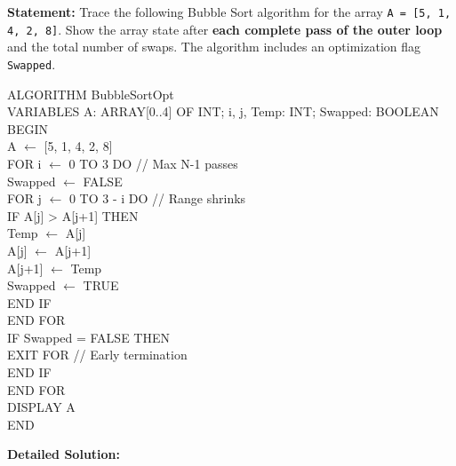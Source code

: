 \documentclass[11pt]{article}
\begin{document}
\begin{exoresolu}
\textbf{Statement:} Trace the following Bubble Sort algorithm for the array \texttt{A = [5, 1, 4, 2, 8]}. Show the array state after \textbf{each complete pass of the outer loop} and the total number of swaps. The algorithm includes an optimization flag \texttt{Swapped}.
\begin{flushleft}
\ttfamily\small
ALGORITHM BubbleSortOpt\\
VARIABLES A: ARRAY[0..4] OF INT; i, j, Temp: INT; Swapped: BOOLEAN\\
BEGIN\\
\hspace{1em}A $\leftarrow$ [5, 1, 4, 2, 8]\\
\hspace{1em}FOR i $\leftarrow$ 0 TO 3 DO \hspace{2em}// Max N-1 passes\\
\hspace{2em}Swapped $\leftarrow$ FALSE\\
\hspace{2em}FOR j $\leftarrow$ 0 TO 3 - i DO \hspace{1em}// Range shrinks\\
\hspace{3em}IF A[j] > A[j+1] THEN\\
\hspace{4em}Temp $\leftarrow$ A[j]\\
\hspace{4em}A[j] $\leftarrow$ A[j+1]\\
\hspace{4em}A[j+1] $\leftarrow$ Temp\\
\hspace{4em}Swapped $\leftarrow$ TRUE\\
\hspace{3em}END IF\\
\hspace{2em}END FOR\\
\hspace{2em}IF Swapped = FALSE THEN\\
\hspace{3em}EXIT FOR \hspace{2em}// Early termination\\
\hspace{2em}END IF\\
\hspace{1em}END FOR\\
\hspace{1em}DISPLAY A\\
END
\end{flushleft}
\tcblower
\textbf{Detailed Solution:}


\end{exoresolu}
\end{document}
